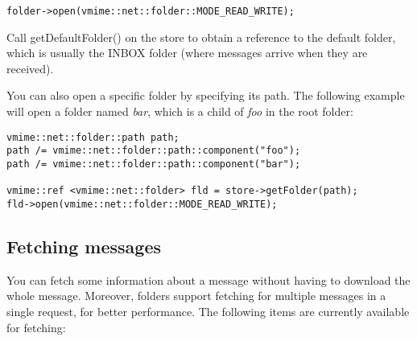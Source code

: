 \begin{lstlisting}
folder->open(vmime::net::folder::MODE_READ_WRITE);
\end{lstlisting}


Call {\vcode getDefaultFolder()} on the store to obtain a reference to the
default folder, which is usually the INBOX folder (where messages arrive when
they are received).

You can also open a specific folder by specifying its path. The following
example will open a folder named \emph{bar}, which is a child of \emph{foo}
in the root folder:

\begin{lstlisting}[caption={Opening a folder from its path}]
vmime::net::folder::path path;
path /= vmime::net::folder::path::component("foo");
path /= vmime::net::folder::path::component("bar");

vmime::ref <vmime::net::folder> fld = store->getFolder(path);
fld->open(vmime::net::folder::MODE_READ_WRITE);
\end{lstlisting}



\subsection{Fetching messages} %

You can fetch some information about a message without having to download the
whole message. Moreover, folders support fetching for multiple messages in
a single request, for better performance. The following items are currently
available for fetching:

